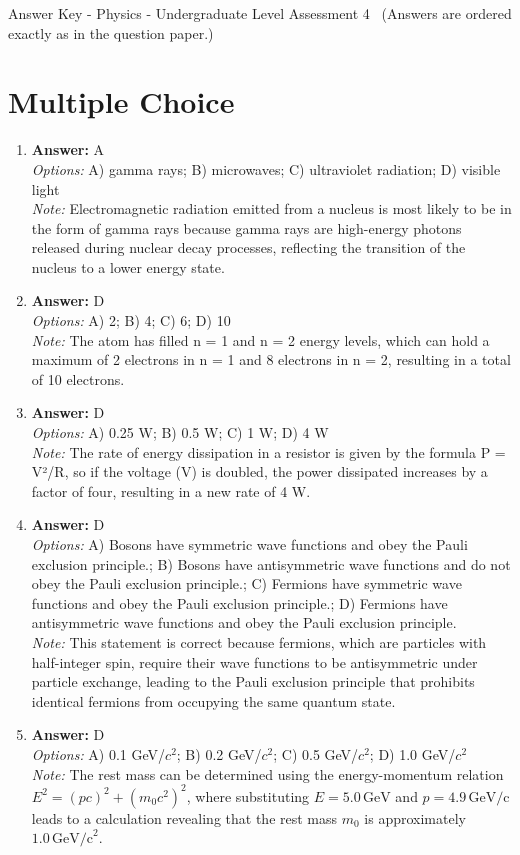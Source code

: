 \documentclass[12pt]{article}
\begin{document}
\begin{center}
Answer Key - Physics - Undergraduate Level Assessment 4 \
\small (Answers are ordered exactly as in the question paper.)
\end{center}

\section*{Multiple Choice}
\begin{enumerate}[label=\arabic*.]
\item \textbf{Answer:} A
\\ \textit{Options:} A) gamma rays; B) microwaves; C) ultraviolet radiation; D) visible light
\\ \textit{Note:} Electromagnetic radiation emitted from a nucleus is most likely to be in the form of gamma rays because gamma rays are high-energy photons released during nuclear decay processes, reflecting the transition of the nucleus to a lower energy state.
\item \textbf{Answer:} D
\\ \textit{Options:} A) 2; B) 4; C) 6; D) 10
\\ \textit{Note:} The atom has filled n = 1 and n = 2 energy levels, which can hold a maximum of 2 electrons in n = 1 and 8 electrons in n = 2, resulting in a total of 10 electrons.
\item \textbf{Answer:} D
\\ \textit{Options:} A) 0.25 W; B) 0.5 W; C) 1 W; D) 4 W
\\ \textit{Note:} The rate of energy dissipation in a resistor is given by the formula P = V²/R, so if the voltage (V) is doubled, the power dissipated increases by a factor of four, resulting in a new rate of 4 W.
\item \textbf{Answer:} D
\\ \textit{Options:} A) Bosons have symmetric wave functions and obey the Pauli exclusion principle.; B) Bosons have antisymmetric wave functions and do not obey the Pauli exclusion principle.; C) Fermions have symmetric wave functions and obey the Pauli exclusion principle.; D) Fermions have antisymmetric wave functions and obey the Pauli exclusion principle.
\\ \textit{Note:} This statement is correct because fermions, which are particles with half-integer spin, require their wave functions to be antisymmetric under particle exchange, leading to the Pauli exclusion principle that prohibits identical fermions from occupying the same quantum state.
\item \textbf{Answer:} D
\\ \textit{Options:} A) 0.1 GeV/$c^2$; B) 0.2 GeV/$c^2$; C) 0.5 GeV/$c^2$; D) 1.0 GeV/$c^2$
\\ \textit{Note:} The rest mass can be determined using the energy-momentum relation \( E^2 = (pc)^2 + (m_0 c^2)^2 \), where substituting \( E = 5.0 \, \text{GeV} \) and \( p = 4.9 \, \text{GeV/c} \) leads to a calculation revealing that the rest mass \( m_0 \) is approximately \( 1.0 \, \text{GeV/c}^2 \).
\end{enumerate}
\end{document}
